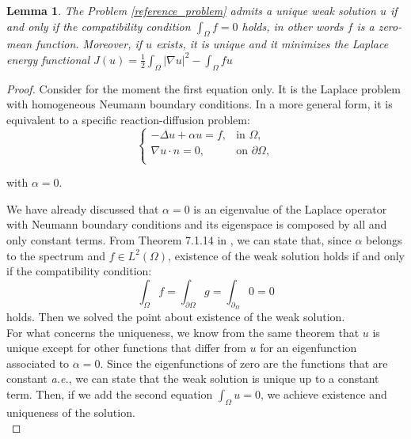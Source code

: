 \documentclass[a4paper,11pt]{article}
\newtheorem{lemma}{Lemma}
\begin{document}
\begin{lemma} \label{first_lemma}
	The Problem \ref{reference_problem} admits a unique weak solution $u$ if and only if the compatibility condition $\int_{\Omega} f = 0$ holds, in other words $f$ is a zero-mean function. Moreover, if $u$ exists, it is unique and it minimizes the Laplace energy functional $J(u) = \frac{1}{2}\int_{\Omega} |\nabla u |^2 - \int_{\Omega}fu$
\end{lemma} \vspace{1mm}
\begin{proof}
	Consider for the moment the first equation only. It is the Laplace problem with homogeneous Neumann boundary conditions. In a more general form, it is equivalent to a specific reaction-diffusion problem:
	\begin{equation*}
	\begin{cases}
	-\Delta{u} + \alpha u =f, & \text{in } \Omega,\\
	\nabla u \cdot n = 0, & \text{on } \partial \Omega, \\
	\end{cases}
	\end{equation*}
	\begin{center}
		with $\alpha = 0$.
	\end{center}
     We have already discussed that $\alpha=0$ is an eigenvalue of the Laplace operator with Neumann boundary conditions and its eigenspace is composed by all and only constant terms. From Theorem 7.1.14 in \cite{gazzola}, we can state that, since $\alpha$ belongs to the spectrum and $f\in L^2(\Omega)$, existence of the weak solution holds if and only if the compatibility condition:
     \begin{equation*}
     \int_{\Omega}f = \int_{\partial \Omega} g = \int_{\partial_\Omega} 0 = 0 
     \end{equation*}
     holds. Then we solved the point about existence of the weak solution. \\
     
     \noindent For what concerns the uniqueness, we know from the same theorem that $u$ is unique except for other functions that differ from $u$ for an eigenfunction associated to $\alpha=0$. Since the eigenfunctions of zero are the functions that are constant \emph{a.e.}, we can state that the weak solution is unique up to a constant term. Then, if we add the second equation $\int_{\Omega}u = 0$, we achieve existence and uniqueness of the solution. \\
     

\end{proof}
\end{document}
